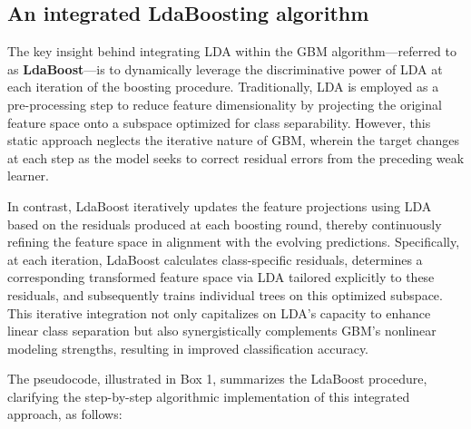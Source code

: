 \documentclass[11pt,a4paper]{article}
\begin{document}
\subsection{An integrated LdaBoosting algorithm}
The key insight behind integrating LDA within the GBM algorithm—referred to as \textbf{LdaBoost}—is to dynamically leverage the discriminative power of LDA at each iteration of the boosting procedure.  
Traditionally, LDA is employed as a pre-processing step to reduce feature dimensionality by projecting the original feature space onto a subspace optimized for class separability.  
However, this static approach neglects the iterative nature of GBM, wherein the target changes at each step as the model seeks to correct residual errors from the preceding weak learner.

In contrast, LdaBoost iteratively updates the feature projections using LDA based on the residuals produced at each boosting round, thereby continuously refining the feature space in alignment with the evolving predictions.  
Specifically, at each iteration, LdaBoost calculates class-specific residuals, determines a corresponding transformed feature space via LDA tailored explicitly to these residuals, and subsequently trains individual trees on this optimized subspace.  
This iterative integration not only capitalizes on LDA’s capacity to enhance linear class separation but also synergistically complements GBM’s nonlinear modeling strengths, resulting in improved classification accuracy.  

The pseudocode, illustrated in Box 1, summarizes the LdaBoost procedure, clarifying the step-by-step algorithmic implementation of this integrated approach, as follows:
\end{document}
